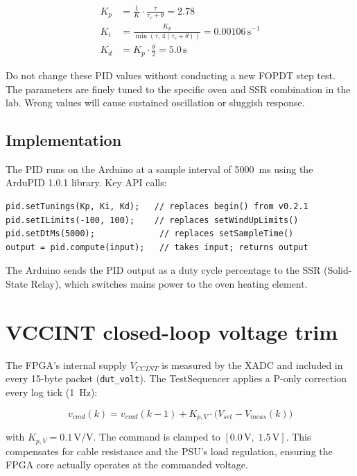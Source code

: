\documentclass[12pt, a4paper]{report}
\begin{document}
\begin{align}
  K_p &= \frac{1}{K} \cdot \frac{\tau}{\tau_c + \theta} = 2.78 \\
  K_i &= \frac{K_p}{\min(\tau,\,4(\tau_c+\theta))} = 0.00106\,\text{s}^{-1} \\
  K_d &= K_p \cdot \frac{\theta}{2} = 5.0\,\text{s}
\end{align}

\begin{warningbox}
Do not change these PID values without conducting a new FOPDT step test.
The parameters are finely tuned to the specific oven and SSR combination in the lab.
Wrong values will cause sustained oscillation or sluggish response.
\end{warningbox}

\subsection{Implementation}

The PID runs on the Arduino at a sample interval of 5000~ms using the ArduPID 1.0.1
library. Key API calls:

\begin{lstlisting}[style=shell, caption={ArduPID 1.0.1 usage}]
pid.setTunings(Kp, Ki, Kd);   // replaces begin() from v0.2.1
pid.setILimits(-100, 100);    // replaces setWindUpLimits()
pid.setDtMs(5000);             // replaces setSampleTime()
output = pid.compute(input);   // takes input; returns output
\end{lstlisting}

The Arduino sends the PID output as a duty cycle percentage to the SSR (Solid-State Relay),
which switches mains power to the oven heating element.

\section{VCCINT closed-loop voltage trim}

The FPGA's internal supply $V_{CCINT}$ is measured by the XADC and included in every
15-byte packet (\texttt{dut\_volt}). The TestSequencer applies a P-only correction
every log tick (1~Hz):

\begin{equation}
  v_{cmd}(k) = v_{cmd}(k-1) + K_{p,V} \cdot \bigl(V_{set} - V_{meas}(k)\bigr)
\end{equation}

with $K_{p,V} = 0.1\,\text{V/V}$. The command is clamped to $[0.0\,\text{V},\;1.5\,\text{V}]$.
This compensates for cable resistance and the PSU's load regulation, ensuring the
FPGA core actually operates at the commanded voltage.
\end{document}
